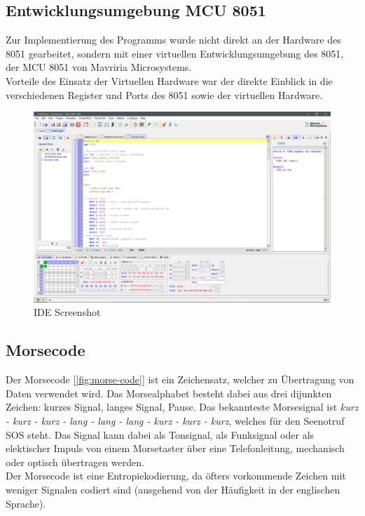 \documentclass[a4paper,12pt]{article}
\begin{document}
	
	\subsection{Entwicklungsumgebung MCU 8051}
	Zur Implementierung des Programms wurde nicht direkt an der Hardware des 8051 gearbeitet, sondern mit einer virtuellen Entwicklungsumgebung des 8051, der MCU 8051 von Mavriria Microsystems.\\
	Vorteile des Einsatz der Virtuellen Hardware war der direkte Einblick in die verschiedenen Register und Ports des 8051 sowie der virtuellen Hardware. 
	\begin{figure}[bt]
		\centering
		\includegraphics[width=0.7\linewidth]{Bilder/IDE8051}
		\caption[IDE Screenshot]{IDE Screenshot}
		\label{fig:ide8051}
	\end{figure}

	\subsection{Morsecode}
	Der Morsecode [\ref{fig:morse-code}] ist ein Zeichensatz, welcher zu Übertragung von Daten verwendet wird. Das Morsealphabet besteht dabei aus drei dijunkten Zeichen: kurzes Signal, langes Signal, Pause. Das bekannteste Morsesignal ist \textit{kurz - kurz - kurz - lang - lang - lang - kurz - kurz - kurz}, welches für den Seenotruf SOS steht. Das Signal kann dabei als Tonsignal, als Funksignal oder als elektischer Impuls von einem Morsetaster über eine Telefonleitung, mechanisch oder optisch übertragen werden.\\
	Der Morsecode ist eine Entropiekodierung, da öfters vorkommende Zeichen mit weniger Signalen codiert sind (ausgehend von der Häufigkeit in der englischen Sprache).\\
\end{document}
